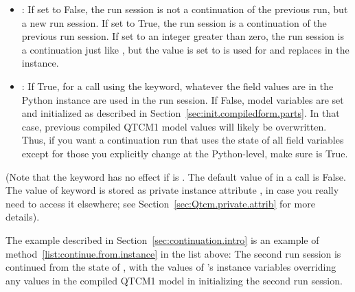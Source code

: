 \begin{itemize}
\item {}: If set to False, the run session is not a
	continuation of the previous run, but a new run session.
	If set to True, the run session is a continuation of the
	previous run session.  If set to an integer greater than
	zero, the run session is a continuation just like
	, but the value
	 is set to is used for  and replaces
	 in the  instance.

\item {}:
	If True, for a  call using the
	 keyword, whatever the field values are in the Python
	instance are used in the run session.
	If False, model variables are set and initialized as described in
	Section~\ref{sec:init.compiledform.parts}.  In that case,
	previous compiled QTCM1 model values will likely be overwritten.
	Thus, if you want a continuation run that uses the state of
	all field variables except for those you explicitly change at
	the Python-level, make sure 
	is True.
\end{itemize}

(Note that the  keyword has no effect if 
is .  The default value of  in a
 call is False.  The value of keyword 
is stored as private instance attribute , in case you
really need to access it elsewhere; see
Section~\ref{sec:Qtcm.private.attrib} for more details).

The example described in Section~\ref{sec:continuation.intro} is
an example of method~\ref{list:continue.from.instance} in the list
above: The second run session is continued from the state of
, with the values of 's instance variables
overriding any values in the compiled QTCM1 model in initializing
the second run session.

